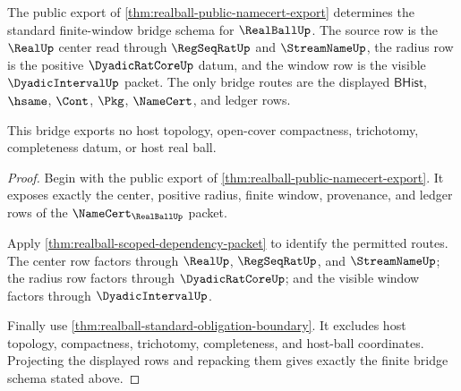 \begin{theorem}
\label{thm:realball-standard-bridge}
The public export of \autoref{thm:realball-public-namecert-export} determines
the standard finite-window bridge schema for $\RealBallUp$. The source row is
the $\RealUp$ center read through $\RegSeqRatUp$ and $\StreamNameUp$, the radius
row is the positive $\DyadicRatCoreUp$ datum, and the window row is the visible
$\DyadicIntervalUp$ packet. The only bridge routes are the displayed
$\mathsf{BHist}$, $\hsame$, $\Cont$, $\Pkg$, $\NameCert$, and ledger rows.

This bridge exports no host topology, open-cover compactness, trichotomy,
completeness datum, or host real ball.
\end{theorem}
\begin{proof}
Begin with the public export of
\autoref{thm:realball-public-namecert-export}. It exposes exactly the center,
positive radius, finite window, provenance, and ledger rows of the
$\NameCert_{\RealBallUp}$ packet.

Apply \autoref{thm:realball-scoped-dependency-packet} to identify the permitted
routes. The center row factors through $\RealUp$, $\RegSeqRatUp$, and
$\StreamNameUp$; the radius row factors through $\DyadicRatCoreUp$; and the
visible window factors through $\DyadicIntervalUp$.

Finally use \autoref{thm:realball-standard-obligation-boundary}. It excludes
host topology, compactness, trichotomy, completeness, and host-ball
coordinates. Projecting the displayed rows and repacking them gives exactly the
finite bridge schema stated above.
\end{proof}

